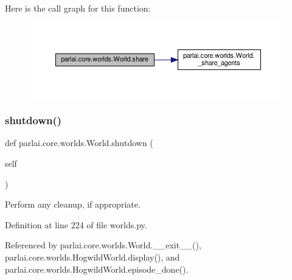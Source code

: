 Here is the call graph for this function\+:
\nopagebreak
\begin{figure}[H]
\begin{center}
\leavevmode
\includegraphics[width=350pt]{classparlai_1_1core_1_1worlds_1_1World_a08d9212397f136cbc52ee224bcb0bc4e_cgraph}
\end{center}
\end{figure}
\mbox{\label{classparlai_1_1core_1_1worlds_1_1World_a7e7e5a27569323dd334b87df6fef31e6}} 
\subsubsection{\texorpdfstring{shutdown()}{shutdown()}}
{\footnotesize\ttfamily def parlai.\+core.\+worlds.\+World.\+shutdown (\begin{DoxyParamCaption}\item[{}]{self }\end{DoxyParamCaption})}

\begin{DoxyVerb}Perform any cleanup, if appropriate.\end{DoxyVerb}
 

Definition at line 224 of file worlds.\+py.



Referenced by parlai.\+core.\+worlds.\+World.\+\_\+\+\_\+exit\+\_\+\+\_\+(), parlai.\+core.\+worlds.\+Hogwild\+World.\+display(), and parlai.\+core.\+worlds.\+Hogwild\+World.\+episode\+\_\+done().


